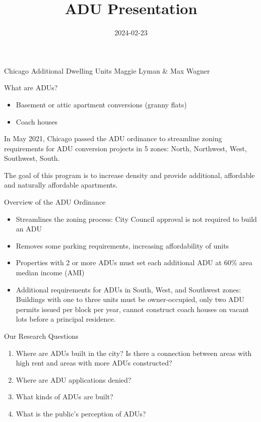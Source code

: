 \documentclass[
  ignorenonframetext,
]{beamer}
\title{ADU Presentation}
\author{}
\date{\vspace{-2.5em}2024-02-23}
\providecommand{\tightlist}{%
  \setlength{\itemsep}{0pt}\setlength{\parskip}{0pt}}
\begin{document}
\frame{\titlepage}

\begin{frame}{Chicago Additional Dwelling Units}
\protect\hypertarget{chicago-additional-dwelling-units}{}
Maggie Lyman \& Max Wagner
\end{frame}

\begin{frame}{What are ADUs?}
\protect\hypertarget{what-are-adus}{}
\begin{itemize}
\tightlist
\item
  Basement or attic apartment conversions (granny flats)
\item
  Coach houses
\end{itemize}

In May 2021, Chicago passed the ADU ordinance to streamline zoning
requirements for ADU conversion projects in 5 zones: North, Northwest,
West, Southwest, South.

The goal of this program is to increase density and provide additional,
affordable and naturally affordable apartments.
\end{frame}

\begin{frame}{Overview of the ADU Ordinance}
\protect\hypertarget{overview-of-the-adu-ordinance}{}
\begin{itemize}
\tightlist
\item
  Streamlines the zoning process: City Council approval is not required
  to build an ADU
\item
  Removes some parking requirements, increasing affordability of units
\item
  Properties with 2 or more ADUs must set each additional ADU at 60\%
  area median income (AMI)
\item
  Additional requirements for ADUs in South, West, and Southwest zones:
  Buildings with one to three units must be owner-occupied, only two ADU
  permits issued per block per year, cannot construct coach houses on
  vacant lots before a principal residence.
\end{itemize}
\end{frame}

\begin{frame}{Our Research Questions}
\protect\hypertarget{our-research-questions}{}
\begin{enumerate}
\tightlist
\item
  Where are ADUs built in the city? Is there a connection between areas
  with high rent and areas with more ADUs constructed?
\item
  Where are ADU applications denied?
\item
  What kinds of ADUs are built?
\item
  What is the public's perception of ADUs?
\end{enumerate}
\end{frame}
\end{document}
